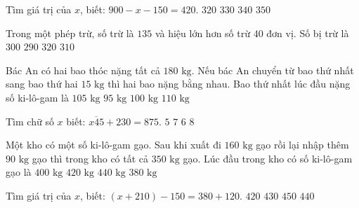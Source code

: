 \begin{ex} %
Tìm giá trị của $x$, biết: $900 - x - 150 = 420$.
\choice
{$320$}
{\True $330$}
{$340$}
{$350$}
\end{ex}

\begin{ex} %
Trong một phép trừ, số trừ là $135$ và hiệu lớn hơn số trừ $40$ đơn vị. Số bị trừ là
\choice
{$300$}
{$290$}
{$320$}
{\True $310$}
\end{ex}

\begin{ex} %
Bác An có hai bao thóc nặng tất cả $180\text{ kg}$. Nếu bác An chuyển từ bao thứ nhất sang bao thứ hai $15\text{ kg}$ thì hai bao nặng bằng nhau. Bao thứ nhất lúc đầu nặng số ki-lô-gam là
\choice
{\True $105\text{ kg}$}
{$95\text{ kg}$}
{$100\text{ kg}$}
{$110\text{ kg}$}
\end{ex}

\begin{ex} %
Tìm chữ số $x$ biết: $\overline{x45} + 230 = 875$.
\choice
{$5$}
{$7$}
{\True $6$}
{$8$}
\end{ex}

\begin{ex} %
Một kho có một số ki-lô-gam gạo. Sau khi xuất đi $160\text{ kg}$ gạo rồi lại nhập thêm $90\text{ kg}$ gạo thì trong kho có tất cả $350\text{ kg}$ gạo. Lúc đầu trong kho có số ki-lô-gam gạo là
\choice
{$400\text{ kg}$}
{\True $420\text{ kg}$}
{$440\text{ kg}$}
{$380\text{ kg}$}
\end{ex}

\begin{ex} %
Tìm giá trị của $x$, biết: $(x + 210) - 150 = 380 + 120$.
\choice
{$420$}
{$430$}
{$450$}
{\True $440$}
\end{ex}

